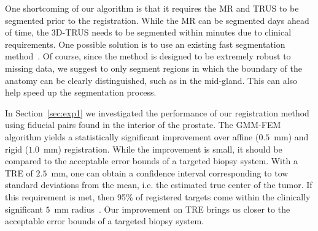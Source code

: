 \documentclass[journal]{IEEEtran}
\begin{document}
One shortcoming of our algorithm is that it requires the MR and TRUS to be segmented prior to the registration. While the MR can be segmented days ahead of time, the 3D-TRUS needs to be segmented within minutes due to clinical requirements. One possible solution is to use an existing fast segmentation method~\cite{Qiu12a}. Of course, since the method is designed to be extremely robust to missing data, we suggest to only segment regions in which the boundary of the anatomy can be clearly distinguished, such as in the mid-gland. This can also help speed up the segmentation process.

In Section~\ref{sec:exp1} we investigated the performance of our registration method using fiducial pairs found in the interior of the prostate. The GMM-FEM algorithm yields a statistically significant improvement over affine ($0.5$~mm) and rigid ($1.0$~mm) registration. While the improvement is small, it should be compared to the acceptable error bounds of a targeted biopsy system. With a TRE of $2.5$~mm, one can obtain a confidence interval corresponding to tow standard deviations from the mean, i.e. the estimated true center of the tumor. If this requirement is met, then 95\% of registered targets come within the clinically significant $5$~mm radius~\cite{Karnik10a}. Our improvement on TRE brings us closer to the acceptable error bounds of a targeted biopsy system.
\end{document}
